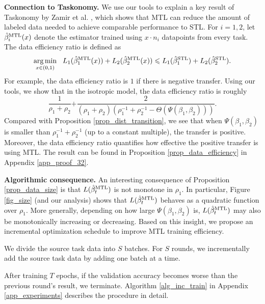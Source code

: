 \textbf{Connection to Taskonomy.} We use our tools to explain a key result of Taskonomy by Zamir et al. \cite{ZSSGM18}, which shows that MTL can reduce the amount of labeled data needed to achieve comparable performance to STL.
For $i = 1, 2$, let $\hat{\beta}_i^{\text{MTL}}(x)$ denote the estimator trained using $x \cdot n_i$ datapoints from every task. The data efficiency ratio is defined as
{\small\[ \operatorname*{arg\,min}_{x\in(0, 1)} ~~
		L_1(\hat{\beta}_1^{\text{MTL}}(x)) + L_2(\hat{\beta}_2^{\text{MTL}}(x))
		\leqslant L_1(\hat{\beta}_1^{\text{STL}}) + L_2(\hat{\beta}_2^{\text{STL}}). \]}
For example, the data efficiency ratio is $1$ if there is negative transfer.
Using our tools, we show that in the isotropic model, the data efficiency ratio is
roughly
{\small\[ \frac{1}{\rho_1 + \rho_2} {+ \frac{2}{(\rho_1 +\rho_2)(\rho_1^{-1} + \rho_2^{-1} - \Theta(\Psi(\beta_1, \beta_2)))}}. \]}%
Compared with Proposition \ref{prop_dist_transition}, we see that when $\Psi(\beta_1, \beta_2)$ is smaller than $\rho_1^{-1} + \rho_2^{-1}$ (up to a constant multiple), the transfer is positive.
Moreover, the data efficiency ratio quantifies how effective the positive transfer is using MTL.
The result can be found in Proposition \ref{prop_data_efficiency} in Appendix \ref{app_proof_32}.

\textbf{Algorithmic consequence.} An interesting consequence of Proposition \ref{prop_data_size} is that $L(\hat{\beta}_t^{\text{MTL}})$ is not monotone in $\rho_1$.
In particular, Figure \ref{fig_size} (and our analysis) shows that $L(\hat{\beta}_t^{\text{MTL}})$ behaves as a quadratic function over $\rho_1$.
More generally, depending on how large $\Psi(\beta_1, \beta_2)$ is, $L(\hat{\beta}_t^{\text{MTL}})$ may also be monotonically increasing or decreasing.
Based on this insight, we propose an incremental optimization schedule to improve MTL training efficiency.
\squishlist
	\item We divide the source task data into $S$ batches.
	For $S$ rounds, we incrementally add the source task data by adding one batch at a time.
	\item After training $T$ epochs, if the validation accuracy becomes worse than the previous round's result, we terminate.
	Algorithm \ref{alg_inc_train} in Appendix \ref{app_experiments} describes the procedure in detail.
\squishend

